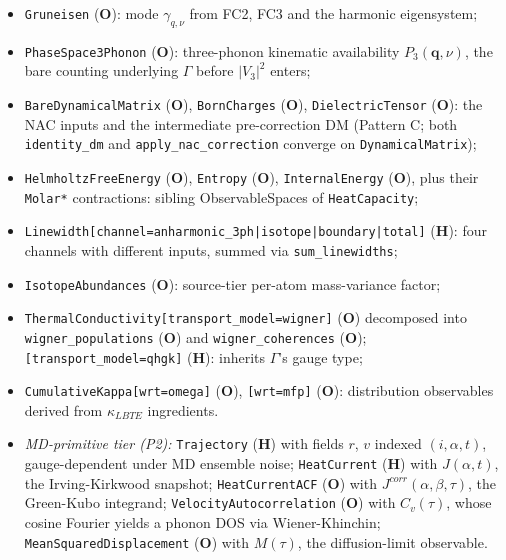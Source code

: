 \documentclass[11pt,a4paper]{article}
\begin{document}
\begin{itemize}[leftmargin=2em, itemsep=0.2em]
  \item \texttt{Gruneisen} (\textbf{O}): mode $\gamma_{q,\nu}$ from FC2, FC3
        and the harmonic eigensystem;
  \item \texttt{PhaseSpace3Phonon} (\textbf{O}): three-phonon kinematic
        availability $P_3(\mathbf{q},\nu)$, the bare counting underlying
        $\Gamma$ before $|V_3|^2$ enters;
  \item \texttt{BareDynamicalMatrix} (\textbf{O}), \texttt{BornCharges}
        (\textbf{O}), \texttt{DielectricTensor} (\textbf{O}):
        the NAC inputs and the intermediate pre-correction DM
        (Pattern C; both \texttt{identity\_dm} and
        \texttt{apply\_nac\_correction} converge on
        \texttt{DynamicalMatrix});
  \item \texttt{HelmholtzFreeEnergy} (\textbf{O}), \texttt{Entropy}
        (\textbf{O}), \texttt{InternalEnergy} (\textbf{O}), plus their
        \texttt{Molar*} contractions: sibling ObservableSpaces of
        \texttt{HeatCapacity};
  \item \texttt{Linewidth[channel=anharmonic\_3ph|isotope|boundary|total]}
        (\textbf{H}): four channels with different inputs, summed via
        \texttt{sum\_linewidths};
  \item \texttt{IsotopeAbundances} (\textbf{O}): source-tier per-atom
        mass-variance factor;
  \item \texttt{ThermalConductivity[transport\_model=wigner]} (\textbf{O})
        decomposed into \texttt{wigner\_populations} (\textbf{O}) and
        \texttt{wigner\_coherences} (\textbf{O});
        \texttt{[transport\_model=qhgk]} (\textbf{H}): inherits
        $\Gamma$'s gauge type;
  \item \texttt{CumulativeKappa[wrt=omega]} (\textbf{O}),
        \texttt{[wrt=mfp]} (\textbf{O}): distribution observables
        derived from $\kappa_{LBTE}$ ingredients.
  \item \emph{MD-primitive tier (P2):}
        \texttt{Trajectory} (\textbf{H}) with fields $r$, $v$ indexed
        $(i,\alpha,t)$, gauge-dependent under MD ensemble noise;
        \texttt{HeatCurrent} (\textbf{H}) with $J(\alpha,t)$, the
        Irving-Kirkwood snapshot;
        \texttt{HeatCurrentACF} (\textbf{O}) with
        $J^{corr}(\alpha,\beta,\tau)$, the Green-Kubo integrand;
        \texttt{VelocityAutocorrelation} (\textbf{O}) with $C_v(\tau)$,
        whose cosine Fourier yields a phonon DOS via Wiener-Khinchin;
        \texttt{MeanSquaredDisplacement} (\textbf{O}) with $M(\tau)$,
        the diffusion-limit observable.

\end{itemize}
\end{document}
